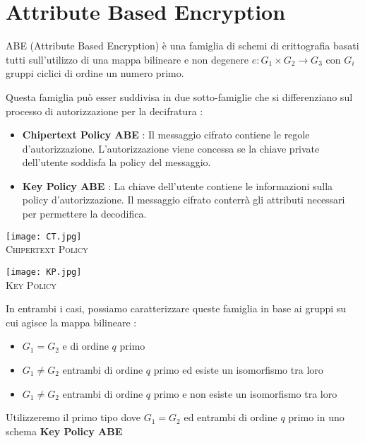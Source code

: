 \chapter{Attribute Based Encryption}

ABE (Attribute Based Encryption) è una famiglia di schemi di crittografia basati tutti sull'utilizzo di una mappa bilineare e non degenere $e:G_1 \times G_2 \rightarrow G_3$ con $G_i$ gruppi ciclici di ordine un numero primo.

Questa famiglia può esser suddivisa in due sotto-famiglie che si differenziano sul processo di autorizzazione per la decifratura :
\begin{itemize}
	\item \textbf{{Chipertext Policy ABE}} :  Il messaggio cifrato contiene le regole d'autorizzazione. L'autorizzazione viene concessa se la chiave private dell'utente soddisfa la policy del messaggio.
	\item \textbf{Key Policy ABE} : La chiave dell'utente contiene le informazioni sulla policy d'autorizzazione. Il messaggio cifrato conterrà gli attributi necessari per permettere la decodifica.
\end{itemize}

\begin{minipage}[c]{0.9\textwidth}
\vspace{0,3cm}
\centering
	\begin{minipage}[c]{0.45\textwidth}
		\centering
		\texttt{[image: CT.jpg]}\\
		{\small\scshape Chipertext Policy}
	\end{minipage}
	\hfill
	\begin{minipage}[c]{0.45\textwidth}
		\centering
		\texttt{[image: KP.jpg]}\\
		{\small\scshape Key Policy}
	\end{minipage}
\vspace{0,8cm}
\end{minipage}

In entrambi i casi, possiamo caratterizzare\cite{maya3} queste famiglia in base ai gruppi su cui agisce la mappa bilineare :
\begin{itemize}
	\item $G_1 = G_2$ e di ordine $q$ primo
	\item $G_1 \neq G_2$ entrambi di ordine $q$ primo ed esiste un isomorfismo tra loro
	\item $G_1 \neq G_2$ entrambi di ordine $q$ primo e non esiste un isomorfismo tra loro
\end{itemize}	

Utilizzeremo il primo tipo dove $G_1 = G_2$ ed entrambi di ordine $q$ primo in uno schema \textbf{Key Policy ABE}

\newpage

\newpage

\newpage


